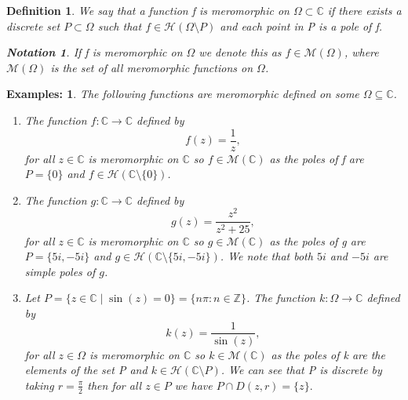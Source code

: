 \documentclass{article}
\newtheorem*{definition}{Definition}
\newtheorem*{notation}{Notation}
\newtheorem*{ex}{Examples:}
\begin{document}
\begin{definition}
We say that a function f is meromorphic on $\Omega\subset\mathbb{C}$ if there exists a discrete set $P\subset\Omega$ such that $f\in\mathcal{H}(\Omega\setminus{P})$ and each point in P is a pole of f. 
\begin{notation}
If f is meromorphic on $\Omega$ we denote this as $f\in\mathcal{M}(\Omega)$, where $\mathcal{M}(\Omega)$ is the set of all meromorphic functions on $\Omega$.
\end{notation}

\end{definition}
\begin{ex} The following functions are meromorphic defined on some $\Omega\subseteq\mathbb{C}$.
\begin{enumerate}
    \item The function $f:\mathbb{C}\to\mathbb{C}$ defined by $$f(z)=\frac{1}{z},$$ for all $z\in\mathbb{C}$ is meromorphic on $\mathbb{C}$ so $f\in\mathcal{M}(\mathbb{C})$ as the poles of f are $P=\{0\}$ and $f\in\mathcal{H}(\mathbb{C}\setminus\{0\})$.
    
    \item The function $g:\mathbb{C}\to\mathbb{C}$ defined by $$g(z)=\frac{z^2}{z^2+25},$$ for all $z\in\mathbb{C}$ is meromorphic on $\mathbb{C}$ so $g\in\mathcal{M}(\mathbb{C})$ as the poles of g are $P=\{5i,-5i\}$ \newline and $g\in\mathcal{H}(\mathbb{C}\setminus\{5i,-5i\})$. We note that both $5i$ and $-5i$ are simple poles of $g$.
    
    
    \item Let $P=\{z\in\mathbb{C}\mid \sin(z)=0\}=\{n\pi:n\in\mathbb{Z}\}$. The function $k:\Omega\to\mathbb{C}$ defined by $$k(z)=\frac{1}{\sin(z)},$$ for all $z\in\Omega$ is meromorphic on $\mathbb{C}$  so $k\in\mathcal{M}(\mathbb{C})$ as the poles of k are the elements of the \newline  set P and $k\in\mathcal{H}(\mathbb{C}\setminus{P})$. We can see that P is discrete by taking $r=\frac{\pi}{2}$ then for all $z\in P$ we have $P\cap D(z,r)=\{z\}.$
\end{enumerate}
\end{ex}
\end{document}
